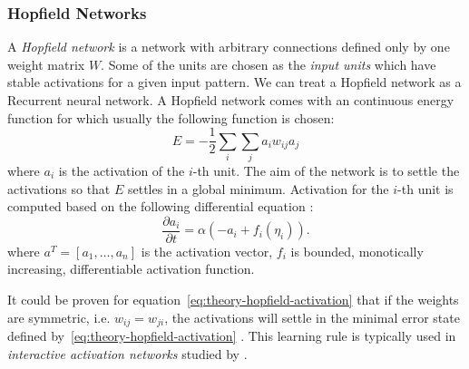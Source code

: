 \subsubsection{Hopfield Networks}
\label{sec:theory-hopfield}

A \emph{Hopfield network} \citep{hopfield1984neurons} is a network with arbitrary connections defined only by one weight matrix $W$. Some of the units are chosen as the \emph{input units} which have stable activations for a given input pattern. We can treat a Hopfield network as a Recurrent neural network. A Hopfield network comes with an continuous energy function for which usually the following function is chosen: 
\begin{equation}
  \label{eq:theory-hopfield-energy}
  E = -\frac{1}{2}\sum_i\sum_ja_iw_{ij}a_j
\end{equation} 
where $a_i$ is the activation of the $i$-th unit. The aim of the network is to settle the activations so that $E$ settles in a global minimum. Activation for the $i$-th unit is computed based on the following differential equation \citep{hopfield1984neurons}: 
\begin{equation}
  \label{eq:theory-hopfield-activation}
  \frac{\partial a_i}{\partial t} = \alpha(-a_i + f_i(\eta_i)).
\end{equation} 
where $a^T = [a_1,\ldots,a_n]$ is the activation vector, $f_i$ is bounded, monotically increasing, differentiable activation function.

It could be proven for equation~\ref{eq:theory-hopfield-activation} that if the weights are symmetric, i.e. $w_{ij} = w_{ji}$, the activations will settle in the minimal error state defined by~\ref{eq:theory-hopfield-activation} \citep{hopfield1984neurons}. This learning rule is typically used in \emph{interactive activation networks} studied by \citet{grossberg1978theory, mcclelland1981interactive}. 

